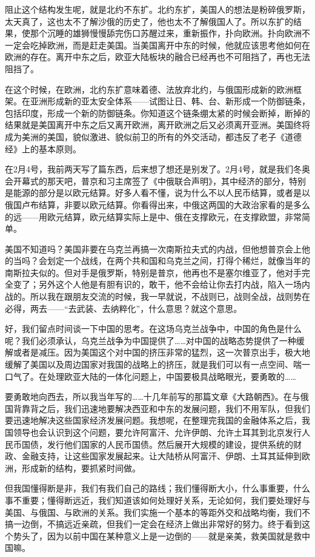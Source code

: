 \documentclass[UTF8, 12pt, a4paper]{ctexrep}
\begin{document}
阻止这个结构发生呢，就是北约不东扩。北约东扩，美国人的想法是粉碎俄罗斯，太天真了，这也太不了解沙俄的历史了，他也太不了解俄国人了。所以东扩的结果，使那个沉睡的雄狮慢慢舔完伤口苏醒过来，重新振作，扑向欧洲。扑向欧洲不一定会吃掉欧洲，而是赶走美国。当美国离开中东的时候，他就应该思考他如何在欧洲的存在。离开中东之后，欧亚大陆板块的融合已经再也不可阻挡了，再也无法阻挡了。

在这个时候，在欧洲，北约东扩意味着德、法放弃北约，与俄国形成新的欧洲框架。在亚洲形成新的亚太安全体系——试图让日、韩、台、新形成一个防御链条，包括印度，形成一个新的防御链条。你知道这个链条绷太紧的时候会断掉，断掉的结果就是美国离开中东之后又离开欧洲，离开欧洲之后又必须离开亚洲。美国终将成为美洲的美国，貌似激进、貌似前卫的所有的外交活动，都违反了老子《道德经》上的基本原则。

在2月4号，我前两天写了篇东西，后来想了想还是别发了。2月4号，就是我们冬奥会开幕式的那天吧，普京和习主席签了《中俄联合声明》，其中经济的部分，特别是能源的部分是以欧元结算。好多人看不懂，说为什么不以人民币结算，或者是以俄国卢布结算，非要以欧元结算。你看得出来，中俄这两国的大政治家看的是多么的远——用欧元结算，欧元结算实际上是中、俄在支撑欧元，在支撑欧盟，非常简单。

美国不知道吗？美国非要在乌克兰再搞一次南斯拉夫式的内战，但他想普京会上他的当吗？会划定一个战线，在两个共和国和乌克兰之间，打得个稀烂，就像当年的南斯拉夫似的。但对手是俄罗斯，特别是普京，他再也不是塞尔维亚了，他对手完全变了；另外这个人他是有胆有识的，敢干，他不会给让你去打内战，陷入一场内战的。所以我在跟朋友交流的时候，我一早就说，不战则已，战则全战，战则势在必得，两去——“去武装、去纳粹化”，什么意思？就这个意思。

好，我们留点时间谈一下中国的思考。在这场乌克兰战争中，中国的角色是什么呢？我们必须承认，乌克兰战争为中国提供了……对中国的战略态势提供了一种缓解或者是减压。因为美国这个对中国的挤压非常的猛烈，这一次普京出手，极大地缓解了美国以及周边国家对我国的战略上的挤压，就是我们可以有一点空间、喘一口气了。在处理欧亚大陆的一体化问题上，中国要极具战略眼光，要勇敢的……

要勇敢地向西去，所以我当年写的……十几年前写的那篇文章《大路朝西》。在与俄国背靠背之后，我们迅速地要解决西亚和中东的发展问题，我们不用军队，但我们要迅速地解决这些国家经济发展问题。我想呢，在整理完我国的金融体系之后，我国领导也会认识到这个问题，要允许阿富汗、允许伊朗、允许土耳其到北京发行人民币国债，发行他们国家的人民币国债。然后展开大规模的建设，提供系统的财政、金融支持，让这些国家发展起来。让大陆桥从阿富汗、伊朗、土耳其延伸到欧洲，形成新的结构，要抓紧时间做。

但我国懂得断是非，我们有我们自己的路线；我们懂得断大小，什么事重要，什么事不重要；懂得断远近，我们知道该如何处理好关系，无论如何，我们要处理好与美国、与俄国、与欧洲的关系。我们实施一个基本的等距外交和战略均衡，我们不搞一边倒，不搞远近亲疏，但我们一定会在经济上做出非常好的努力。终于看到这个势头了，因为以前中国在某种意义上是一边倒的——就是亲美，救美国就是救中国嘛。
\end{document}
